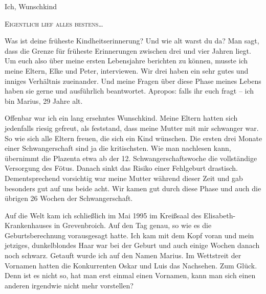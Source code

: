 \documentclass[fontsize=14pt,a4paper,headinclude,DIV=calc,automark]{scrbook}
\begin{document}

\mainmatter

\clearpairofpagestyles %
\rehead{\leftmark}     %
\lehead{\thepage}      %
\rohead{\thepage}      %
\lohead{\leftmark}     %

\pagestyle{scrheadings}

\thispagestyle{scrheadings} %

\leavevmode
{\noindent\fontsize{18}{24}\selectfont\textcolor{myblue}{Ich, Wunschkind}\par}
{\noindent\fontsize{14}{20}\selectfont\scshape\textcolor{myblue}{Eigentlich lief alles bestens}\ldots\par}
\vspace*{0.5\baselineskip}
\normalsize

\noindent Was ist deine früheste Kindheitserinnerung? Und wie alt warst du da? Man sagt, dass die Grenze für früheste Erinnerungen zwischen drei und vier Jahren liegt. Um euch also über meine ersten Lebensjahre berichten zu können, musste ich meine Eltern, Elke und Peter, interviewen. Wir drei haben ein sehr gutes und inniges Verhältnis zueinander. Und meine Fragen über diese Phase meines Lebens haben sie gerne und ausführlich beantwortet. Apropos: falls ihr euch fragt – ich bin Marius, 29 Jahre alt.

Offenbar war ich ein lang ersehntes Wunschkind. Meine Eltern hatten sich jedenfalls riesig gefreut, als feststand, dass meine Mutter mit mir schwanger war. So wie sich alle Eltern freuen, die sich ein Kind wünschen. Die ersten drei Monate einer Schwangerschaft sind ja die kritischsten. Wie man nachlesen kann, übernimmt die Plazenta etwa ab der 12. Schwangerschaftswoche die vollständige Versorgung des Fötus. Danach sinkt das Risiko einer Fehlgeburt drastisch. Dementsprechend vorsichtig war meine Mutter während dieser Zeit und gab besonders gut auf uns beide acht. Wir kamen gut durch diese Phase und auch die übrigen 26 Wochen der Schwangerschaft.

Auf die Welt kam ich schließlich im Mai 1995 im Kreißsaal des Elisabeth-Kran\-ken\-hau\-ses in Grevenbroich. Auf den Tag genau, so wie es die Geburtsberechnung vorausgesagt hatte. Ich kam mit dem Kopf voran und mein jetziges, dunkelblondes Haar war bei der Geburt und auch einige Wochen danach noch schwarz. Getauft wurde ich auf den Namen Marius. Im Wettstreit der Vornamen hatten die Konkurrenten Oskar und Luis das Nachsehen. Zum Glück. Denn ist es nicht so, hat man erst einmal einen Vornamen, kann man sich einen anderen irgendwie nicht mehr vorstellen?
\end{document}
